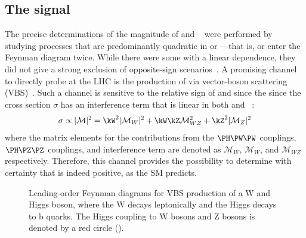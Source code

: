 \subsection{The signal}
The precise determinations of the magnitude of \kW and \kZ~\cite{NatureHiggsCMS2022} were performed by studying processes that are predominantly quadratic in \kW or \kZ---that is, \kW or \kZ enter the Feynman diagram twice. %
While there were some with a linear dependence, they did not give a strong exclusion of opposite-sign scenarios~\cite{BestCMSLambdaWZ}. 
A promising channel to directly probe \lambdaWZ at the LHC is the production of \VH via vector-boson scattering (VBS)~\cite{Theory2LambdaWZ}.
Such a channel is sensitive to the relative sign of \kW and \kZ since the since the cross section $\sigma$ has an interference term that is linear in both \kW and \kZ~\cite{Theory2LambdaWZ}: 
\begin{equation}\label{eq:matrix_elem}
    \sigma \propto |\mathcal{M}|^2 = \kW^2|\mathcal{M}_W|^2 + \kW\kZ\mathcal{M}_{WZ}^2 + \kZ^2|\mathcal{M}_Z|^2
\end{equation}
where the matrix elements for the contributions from the $\PH\PW\PW$ couplings, $\PH\PZ\PZ$ couplings, and interference term are denoted as $\mathcal{M}_W$, $\mathcal{M}_W$, and $\mathcal{M}_{WZ}$ respectively. 
Therefore, this channel provides the possibility to determine with certainty that \lambdaWZ is indeed positive, as the SM predicts.
\begin{figure}[htb]
    \centering
    \quad
    \quad
    \caption{
        Leading-order Feynman diagrams for VBS production of a W and Higgs boson, where the W decays leptonically and the Higgs decays to b quarks. 
        The Higgs coupling to W bosons \kW and Z bosons \kZ is denoted by a red circle (\textcolor{red}{}). 
    }
    \label{fig:vbswh_feynman}
\end{figure}

